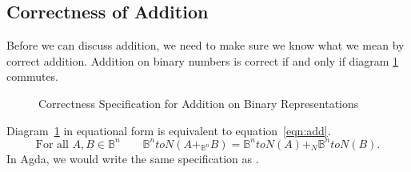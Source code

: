\documentclass[14pt]{extarticle}  %
\begin{document}
\subsection{Correctness of Addition}
Before we can discuss addition, we need to make sure we know what we mean by correct addition. Addition on binary numbers is correct
if and only if diagram \ref{fig:add} commutes.
\begin{figure}
\centering
\caption{Correctness Specification for Addition on Binary Representations}
\label{fig:add}
\end{figure}
Diagram~\ref{fig:add} in equational form is equivalent to equation~\ref{eqn:add}.
\begin{equation}\label{eqn:add}
  \text{For all } A , B \in \mathbb{B}^{n} \qquad \mathbb{B}^{n}toN(A+_{\mathbb{B}^{n}}B) = \mathbb{B}^{n}toN(A)+_{N}\mathbb{B}^{n}toN(B).
\end{equation}
In Agda, we would write the same specification as .
\end{document}
